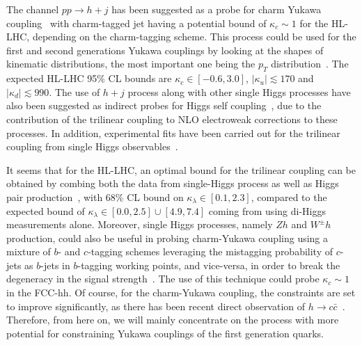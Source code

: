 The channel $pp \to h +j $ has been suggested as a probe for charm Yukawa coupling~\cite{Brivio:2015fxa} with charm-tagged jet having a potential bound of $\kappa_c\sim 1$ for the HL-LHC, depending on the charm-tagging scheme. This process could be used for the first and second generations Yukawa couplings by looking at the shapes of kinematic distributions, the most important one being the $p_T$ distribution~\cite{Soreq:2016rae,Bishara:2016jga, Bonner:2016sdg}. The expected HL-LHC 95\% CL bounds are $\kappa_c \in [-0.6,3.0]$, $|\kappa_u |\lesssim 170 $ and $|\kappa_d| \lesssim 990$. The use of $h+j$ process along with other single Higgs processes have also been suggested as indirect probes for Higgs self coupling~\cite{McCullough:2013rea,Gorbahn:2016uoy,Bizon:2016wgr,Degrassi:2016wml,Maltoni:2017ims,Degrassi:2021uik}, due to the contribution of the trilinear coupling to NLO electroweak corrections to these processes. In addition, experimental fits have been carried out for the trilinear coupling from single Higgs observables~\cite{CMS:2018rig,ATLAS:2019pbo}. 

It seems that for the HL-LHC, an optimal bound for the trilinear coupling can be obtained by combing both the data from single-Higgs process as well as Higgs pair production~\cite{DiVita:2017eyz}, with 68\% CL bound on $\kappa_\lambda \in[0.1,2.3]$, compared to the expected bound of $\kappa_\lambda \in [0.0,2.5] \cup [4.9,7.4]$ coming from using di-Higgs measurements alone. Moreover, single Higgs processes, namely $Zh$ and $ W^\pm h$ production, could also be useful in probing charm-Yukawa coupling using a mixture of $b$- and $c$-tagging schemes leveraging the mistagging probability of $c$-jets as $b$-jets in $b$-tagging working points, and vice-versa, in order to break the degeneracy in the signal strength~\cite{Perez:2015lra}. The use of this technique could probe $\kappa_c \sim 1$ in the FCC-hh. Of course, for the charm-Yukawa coupling, the constraints are set to improve significantly, as there has been recent direct observation of $h\to c \bar c$~\cite{ATLAS-CONF-2021-021}. Therefore, from here on, we will mainly concentrate  on the process with more potential for constraining Yukawa couplings of the first generation quarks. 

